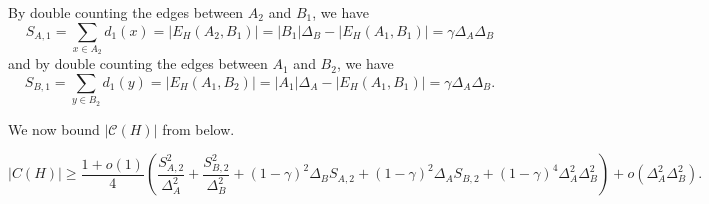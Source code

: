 \documentclass[11pt]{amsart}
\newcommand{\cc}{\mathcal{C}}
\begin{document}
By double counting the edges between $A_2$ and $B_1$,  we have  
\begin{equation}\label{equ: Sx1}
    S_{A,1} =\sum_{x\in A_2}d_1(x)=|E_H(A_2,B_1)|=|B_1|\Delta_B-|E_H(A_1,B_1)|=\gamma \Delta_A\Delta_B
\end{equation}   
and by double counting the edges between $A_1$ and $B_2$, we have
\begin{equation}\label{equ: Sx2}
S_{B,1} =\sum_{y\in B_2}d_1(y)=|E_H(A_1,B_2)|=|A_1|\Delta_A-|E_H(A_1,B_1)|=\gamma \Delta_A\Delta_B.
\end{equation} 
 

 


We now bound $|\cc(H)|$ from below.  

\begin{lemma}\label{clm C(H)}
\[
 |C(H)| \ge 
 \frac{ 1+o(1) }{4} \left(\frac{S_{A,2}^2}{\Delta_A^2} + \frac{S_{B,2}^2}{\Delta_B^2} + (1-\gamma)^2\Delta_B S_{A,2} + (1-\gamma)^2\Delta_A S_{B,2} + (1-\gamma)^4\Delta_A^2\Delta_B^2   \right)+o(\Delta_A^2\Delta_B^2) . \]
\end{lemma} 
\end{document}
